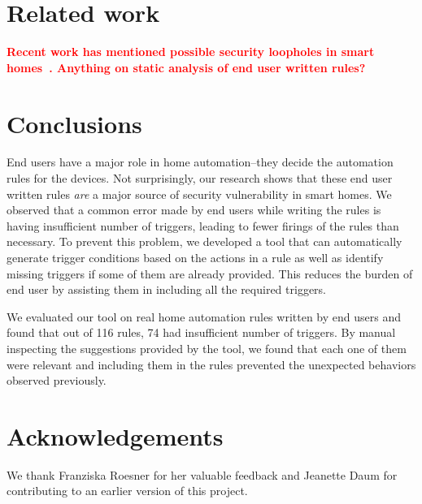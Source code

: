 \documentclass{sig-alternate-05-2015}
\newcommand\todo[1]{\textbf{\textcolor{red}{#1}}}
\begin{document}
\section{Related work}
\todo{\cite{smartthings16, todayToTomorrow, rvs, homer, utea}
Recent work has mentioned possible security loopholes in smart homes~\cite{yoshi, dhanjani, jung}. Anything on static analysis of end user written rules? }

\section{Conclusions}
End users have a major role in home automation--they decide the automation rules for the devices. Not surprisingly, our research shows that these end user written rules \textit{are} a major source of security vulnerability in smart homes.
We observed that a common error made by end users while writing the rules is having insufficient number of triggers, leading to fewer firings of the rules than necessary. To prevent this problem, we developed a tool that can automatically generate trigger conditions based on the actions in a rule as well as identify missing triggers if some of them are already provided. This reduces the burden of end user by assisting them in including all the required triggers. 

We evaluated our tool on real home automation rules written by end users and found that out of 116 rules, 74 had insufficient number of triggers. By manual inspecting the suggestions provided by the tool, we found that each one of them were relevant and including them in the rules prevented the unexpected behaviors observed previously. 


\section{Acknowledgements}
We thank Franziska Roesner for her valuable feedback and Jeanette Daum for contributing to an earlier version of this project.

  
\end{document}
